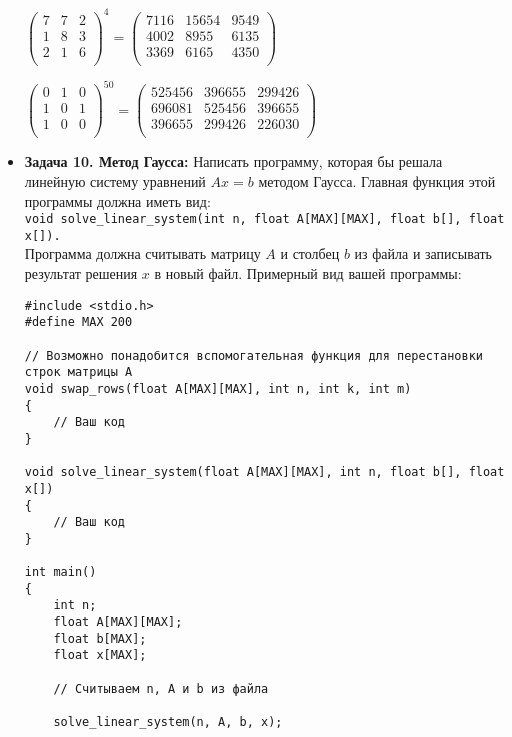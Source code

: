 \documentclass{article}
\begin{document}
\begin{itemize}
\begin{center}
$
\begin{pmatrix}
7 & 7 & 2 \\
1 & 8 & 3 \\
2 & 1 & 6 \\
\end{pmatrix}^4 = 
\begin{pmatrix}
7116 & 15654 & 9549 \\
4002 & 8955 & 6135 \\
3369 & 6165 & 4350 \\
\end{pmatrix}
$
\end{center}

\begin{center}
$
\begin{pmatrix}
0 & 1 & 0 \\
1 & 0 & 1 \\
1 & 0 & 0 \\
\end{pmatrix}^{50} = 
\begin{pmatrix}
525456 & 396655 & 299426 \\
696081 & 525456 & 396655 \\
396655 & 299426 & 226030 \\
\end{pmatrix}
$
\end{center}
\item \textbf{Задача 10. Метод Гаусса:} 
Написать программу, которая бы решала линейную систему уравнений $Ax = b$ методом Гаусса. Главная функция этой программы должна иметь вид: \\ \texttt{void solve\_linear\_system(int n, float A[MAX][MAX], float b[], float x[]).} \\
Программа должна считывать матрицу $A$ и столбец $b$ из файла и записывать результат решения $x$ в новый файл. Примерный вид вашей программы:
\begin{lstlisting}
#include <stdio.h>
#define MAX 200

// Возможно понадобится вспомогательная функция для перестановки строк матрицы A
void swap_rows(float A[MAX][MAX], int n, int k, int m)
{
    // Ваш код
}

void solve_linear_system(float A[MAX][MAX], int n, float b[], float x[])
{
    // Ваш код
}

int main()
{
    int n;
    float A[MAX][MAX];
    float b[MAX];
    float x[MAX];
    
    // Считываем n, A и b из файла
	
    solve_linear_system(n, A, b, x);
    

\end{lstlisting}
\end{itemize}
\end{document}
